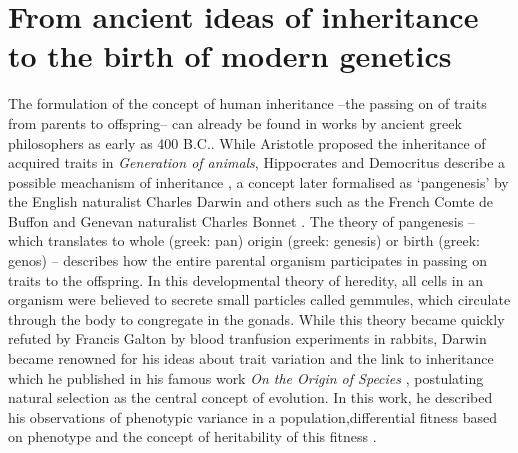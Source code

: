 \section{From ancient ideas of inheritance to the birth of modern genetics}
The formulation of the concept of human inheritance --the passing on of traits from parents to offspring-- can already be found in works by ancient greek philosophers as early as 400 B.C.. While Aristotle proposed the inheritance of acquired traits in \textit{Generation of animals}, Hippocrates and Democritus describe a possible meachanism of inheritance \citep{Zirkle1935}, a concept later formalised as `pangenesis' by the English naturalist Charles Darwin \citep{Darwin1868} and others such as the French Comte de Buffon \citep{Buffon1749} and Genevan naturalist Charles Bonnet \citep{Bonnet1781}. The theory of pangenesis -- which translates to whole (greek: pan) origin (greek: genesis) or birth (greek: genos) -- describes how the entire parental organism participates in passing on traits to the offspring. In this developmental theory of heredity, all cells in an organism were believed to secrete small particles called gemmules, which circulate through the body to congregate in the gonads. While this theory became quickly refuted by Francis Galton by blood tranfusion experiments in rabbits, Darwin became renowned for his ideas about trait variation and the link to inheritance which he published in his famous work \textit{On the Origin of Species} \citep{Darwin1859}, postulating natural selection as the central concept of evolution. In this work, he described his observations of phenotypic variance in a population,differential fitness based on phenotype and the concept of heritability of this fitness \citep{Lewontin1970}. 


